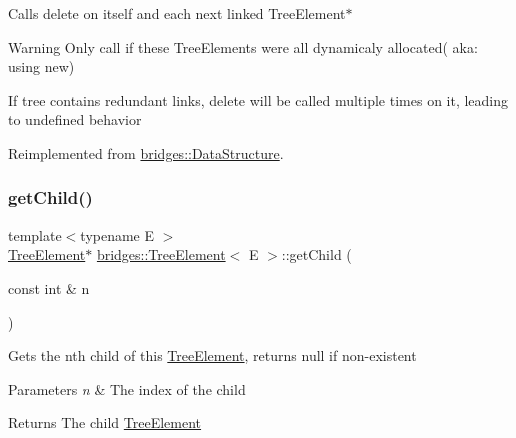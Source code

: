 Calls delete on itself and each next linked Tree\+Element$\ast$

\begin{DoxyWarning}{Warning}
Only call if these Tree\+Elements were all dynamicaly allocated( aka\+: using new) 

If tree contains redundant links, delete will be called multiple times on it, leading to undefined behavior 
\end{DoxyWarning}


Reimplemented from \mbox{\hyperlink{classbridges_1_1_data_structure_ac3ad75810fd77f0ad35b9b5123d2c8f8}{bridges\+::\+Data\+Structure}}.

\mbox{\label{classbridges_1_1_tree_element_a14ce2d5b3a4df29c93a0c37dbe73f7a5}} 
\subsubsection{\texorpdfstring{get\+Child()}{getChild()}\hspace{0.1cm}{\footnotesize\ttfamily [1/2]}}
{\footnotesize\ttfamily template$<$typename E $>$ \\
\mbox{\hyperlink{classbridges_1_1_tree_element}{Tree\+Element}}$\ast$ \mbox{\hyperlink{classbridges_1_1_tree_element}{bridges\+::\+Tree\+Element}}$<$ E $>$\+::get\+Child (\begin{DoxyParamCaption}\item[{const int \&}]{n }\end{DoxyParamCaption})\hspace{0.3cm}{\ttfamily [inline]}}

Gets the nth child of this \mbox{\hyperlink{classbridges_1_1_tree_element}{Tree\+Element}}, returns null if non-\/existent


\begin{DoxyParams}{Parameters}
{\em n} & The index of the child \\
\hline
\end{DoxyParams}
\begin{DoxyReturn}{Returns}
The child \mbox{\hyperlink{classbridges_1_1_tree_element}{Tree\+Element}} 
\end{DoxyReturn}
\mbox{\label{classbridges_1_1_tree_element_a23321ef35ce04dd09487824af804e27b}} 
